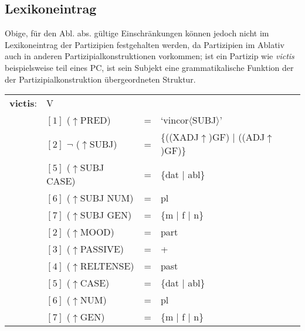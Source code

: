 \documentclass[12pt,a4paper]{article}
\begin{document}
\subsection{Lexikoneintrag}
Obige, für den Abl. abs. gültige Einschränkungen können jedoch nicht im Lexikoneintrag der Partizipien festgehalten werden, da Partizipien im Ablativ auch in anderen Partizipialkonstruktionen vorkommen; ist ein Partizip wie \textit{victis} beispielsweise teil eines PC, ist sein Subjekt eine grammatikalische Funktion der der Partizipialkonstruktion übergeordneten Struktur.
\begin{singlespace}
\begin{tabular}{ l  l  l  l  } 
\textbf{victis}: & V \\
$\qquad$ & $[1]$ \:  ($\uparrow$PRED) & = & `vincor$\langle$SUBJ$\rangle$'\\
$\qquad$ & $[2]$ \: $\neg$ ($\uparrow$SUBJ) & = & \{((XADJ$\uparrow$)GF) $\mid$ ((ADJ$\uparrow$)GF)\} \\
$\qquad$ & $[5]$ \: ($\uparrow$SUBJ CASE) & = & \{dat $\mid$ abl\} \\
$\qquad$ & $[6]$ \:  ($\uparrow$SUBJ NUM) & = & pl \\
$\qquad$ & $[7]$ \: ($\uparrow$SUBJ GEN) & = & \{m $\mid$ f $\mid$ n\} \\
$\qquad$ & $[2]$ \:  ($\uparrow$MOOD) & = & part\\
$\qquad$ & $[3]$ \: ($\uparrow$PASSIVE) & = & + \\
$\qquad$ & $[4]$ \: ($\uparrow$RELTENSE) & = & past \\
$\qquad$ & $[5]$ \: ($\uparrow$CASE) & = & \{dat $\mid$ abl\} \\
$\qquad$ & $[6]$ \:  ($\uparrow$NUM) & = & pl \\
$\qquad$ & $[7]$ \: ($\uparrow$GEN) & = & \{m $\mid$ f $\mid$ n\} \\
\end{tabular}
\end{singlespace}
\end{document}
